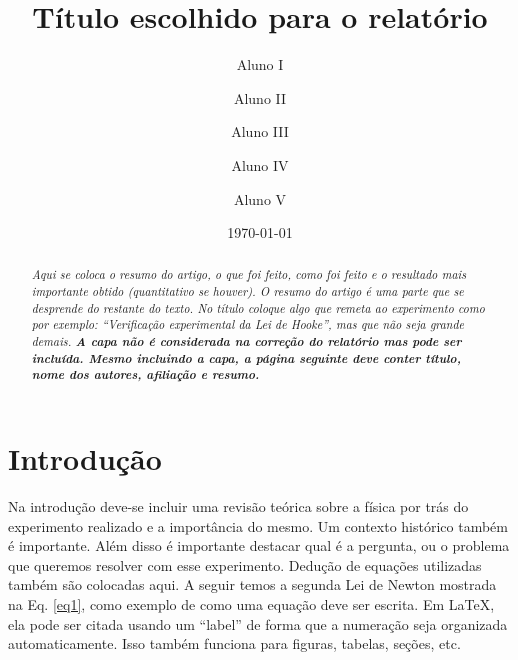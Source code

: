 \documentclass[reprint,amsmath,amssymb,aps,prl,floatfix,onecolumn]{revtex4-2}
\begin{document}


	
	\title{Título escolhido para o relatório}%
	
	\author{Aluno I}
	\author{Aluno II}
	\author{Aluno III}
	\author{Aluno IV}
	\author{Aluno V}
	
	
	\date{\today}
	
	\begin{abstract}
		\textit{Aqui se coloca o resumo do artigo, o que foi feito, como foi feito e o resultado mais importante obtido (quantitativo se houver). O resumo do artigo é uma parte que se desprende do restante do texto. No título coloque algo que remeta ao experimento como por exemplo: ``Verificação experimental da Lei de Hooke'', mas que não seja grande demais. \textbf{A capa não é considerada na correção do relatório mas pode ser incluída. Mesmo incluindo a capa, a página seguinte deve conter título, nome dos autores, afiliação e resumo.}}  
	\end{abstract}
	
	
	\maketitle

\section{Introdução}
	
Na introdução deve-se incluir uma revisão teórica sobre a física por trás do experimento realizado e a importância do mesmo. Um contexto histórico também é importante. Além disso é importante destacar qual é a pergunta, ou o problema que queremos resolver com esse experimento. Dedução de equações utilizadas também são colocadas aqui. A seguir temos a segunda Lei de Newton mostrada na Eq. \ref{eq1}, como exemplo de como uma equação deve ser escrita. Em \LaTeX, ela pode ser citada usando um ``label'' de forma que a numeração seja organizada automaticamente. Isso também funciona para figuras, tabelas, seções, etc.  
\end{document}
